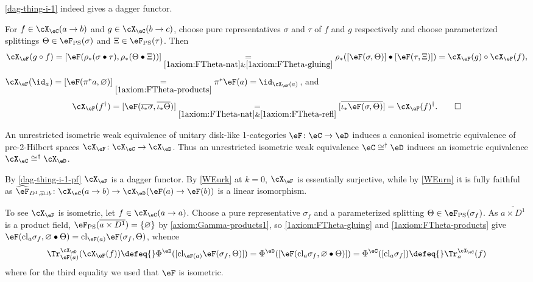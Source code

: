 \documentclass[12pt,reqno]{amsart}
\newcommand{\cl}{\mathrm{cl}}
\newcommand{\psn}{\Phi}
\newcommand{\D}{\eD}
\newcommand{\blt}{\bullet}
\newcommand{\fcj}[1]{\overline{#1}}
\newcommand{\orev}{\overline}
\renewcommand{\amalg}{\sqcup}
\begin{document}
\begin{lemma}
  \label{dag-thing-i-1-pf}
  \cref{dag-thing-i-1} indeed gives a dagger functor.
\end{lemma}

\begin{pf}
For $f\in\cX_\eC(a\to b)$ and $g\in\cX_\eC(b\to c)$, choose pure representatives $\sigma$ and $\tau$ of $f$ and $g$ respectively and choose parameterized splittings $\Theta\in\eF_{\mathrm{PS}}(\sigma)$ and $\Xi\in\eF_{\mathrm{PS}}(\tau)$. Then
\[
\cX_\eF(g\circ f)=[\eF(\rho_*(\sigma\blt\tau),\rho_*(\Theta\blt\Xi))]
\underset{\ref{1axiom:FTheta-nat}\&\ref{1axiom:FTheta-gluing}}{=}\rho_*([\eF(\sigma,\Theta)]\blt[\eF(\tau,\Xi)])=\cX_\eF(g)\circ\cX_\eF(f),
\]
$\cX_\eF(\id_a)=[\eF(\pi^*a,\varnothing)]\underset{\ref{1axiom:FTheta-products}}{=}\pi^*\eF(a)=\id_{\cX_\eF(a)}$, and
\[
\cX_\eF(f^\dag)=[\eF(\fcj{\iota_*\sigma},\orev{\iota_*\Theta})]\underset{\ref{1axiom:FTheta-nat}\&\ref{1axiom:FTheta-refl}}{=}[\fcj{\iota_*\eF(\sigma,\Theta)}]=\cX_\eF(f)^\dag.\qedhere
\]
\end{pf}

\begin{lemma}
\label{CcongD implies XCcongXD}
An unrestricted isometric weak equivalence of unitary disk-like 1-categories $\eF\colon\eC\to\D$ induces a canonical isometric equivalence of pre-2-Hilbert spaces $\cX_\eF\colon\cX_\eC\to\cX_\D$. Thus an unrestricted isometric weak equivalence $\eC\cong^\dag\D$ induces an isometric equivalence $\cX_\eC\cong^\dag\cX_\D$.
\end{lemma}

\begin{pf}
By \cref{dag-thing-i-1-pf} $\cX_\eF$ is a dagger functor. By \ref{WEurk} at $k=0$, $\cX_\eF$ is essentially surjective, while by \ref{WEurn} it is fully faithful as $\widehat\eF_{D^1,\fcj a\amalg b}\colon\cX_\eC(a\to b)\to\cX_\D(\eF(a)\to\eF(b))$ is a linear isomorphism.

To see $\cX_\eF$ is isometric, let $f\in\cX_\eC(a\to a)$. Choose a pure representative $\sigma_f$ and a parameterized splitting $\Theta\in\eF_{\mathrm{PS}}(\sigma_f)$. As $\fcj{a\times D^1}$ is a product field, $\eF_{\mathrm{PS}}(\fcj{a\times D^1})=\{\varnothing\}$ by \ref{axiom:Gamma-products1}, so \ref{1axiom:FTheta-gluing} and \ref{1axiom:FTheta-products} give $\eF(\cl_a\sigma_f,\varnothing\blt\Theta)=\cl_{\eF(a)}\eF(\sigma_f,\Theta)$, whence
\[
    \Tr^{\cX_\D}_{\eF(a)}(\cX_\eF(f)) 
    \defeq{}
    \psn^\D([\cl_{\eF(a)}\eF(\sigma_f,\Theta)])
    =
    \psn^\D([\eF(\cl_a\sigma_f,\varnothing\blt\Theta)])
    = 
    \psn^\eC([\cl_a\sigma_f])
    \defeq{}
    \Tr^{\cX_\eC}_a(f)
\]
where for the third equality we used that $\eF$ is isometric.
\end{pf}
\end{document}
